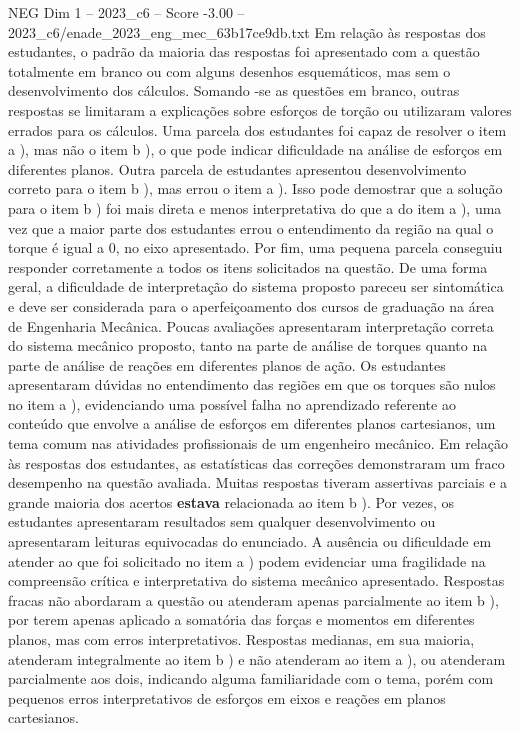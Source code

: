 \begin{textsample}{NEG Dim 1 – 2023\_c6 – Score -3.00 – 2023\_c6/enade\_2023\_eng\_mec\_63b17ce9db.txt}
Em relação às respostas dos estudantes, o padrão da maioria das respostas foi apresentado com a questão totalmente em branco ou com alguns desenhos esquemáticos, mas sem o desenvolvimento dos cálculos.
Somando -se as questões em branco, outras respostas se limitaram a explicações sobre esforços de torção ou utilizaram valores errados para os cálculos.
Uma parcela dos estudantes foi capaz de resolver o item a ), mas não o item b ), o que pode indicar dificuldade na análise de esforços em diferentes planos.
Outra parcela de estudantes apresentou desenvolvimento correto para o item b ), mas errou o item a ).
Isso pode demostrar que a solução para o item b ) foi mais direta e menos interpretativa do que a do item a ), uma vez que a maior parte dos estudantes errou o entendimento da região na qual o torque é igual a 0, no eixo apresentado.
Por fim, uma pequena parcela conseguiu responder corretamente a todos os itens solicitados na questão.
De uma forma geral, a dificuldade de interpretação do sistema proposto pareceu ser sintomática e deve ser considerada para o aperfeiçoamento dos cursos de graduação na área de Engenharia Mecânica.
Poucas avaliações apresentaram interpretação correta do sistema mecânico proposto, tanto na parte de análise de torques quanto na parte de análise de reações em diferentes planos de ação.
Os estudantes apresentaram dúvidas no entendimento das regiões em que os torques são nulos no item a ), evidenciando uma possível falha no aprendizado referente ao conteúdo que envolve a análise de esforços em diferentes planos cartesianos, um tema comum nas atividades profissionais de um engenheiro mecânico.
Em relação às respostas dos estudantes, as estatísticas das correções demonstraram um fraco desempenho na questão avaliada.
Muitas respostas tiveram assertivas parciais e a grande maioria dos acertos \textbf{estava} relacionada ao item b ).
Por vezes, os estudantes apresentaram resultados sem qualquer desenvolvimento ou apresentaram leituras equivocadas do enunciado.
A ausência ou dificuldade em atender ao que foi solicitado no item a ) podem evidenciar uma fragilidade na compreensão crítica e interpretativa do sistema mecânico apresentado.
Respostas fracas não abordaram a questão ou atenderam apenas parcialmente ao item b ), por terem apenas aplicado a somatória das forças e momentos em diferentes planos, mas com erros interpretativos.
Respostas medianas, em sua maioria, atenderam integralmente ao item b ) e não atenderam ao item a ), ou atenderam parcialmente aos dois, indicando alguma familiaridade com o tema, porém com pequenos erros interpretativos de esforços em eixos e reações em planos cartesianos.

\end{textsample}
